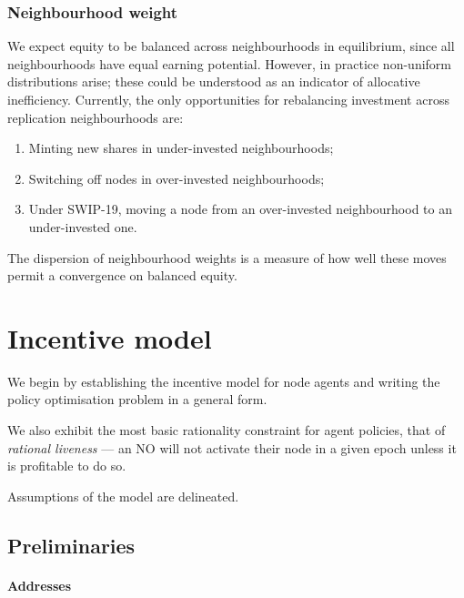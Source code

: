 \subsubsection{Neighbourhood weight}

We expect equity to be balanced across neighbourhoods in equilibrium, since all neighbourhoods have equal earning potential.
%
However, in practice non-uniform distributions arise; these could be understood as an indicator of allocative inefficiency.
%
Currently, the only opportunities for rebalancing investment across replication neighbourhoods are:
\begin{enumerate}
  \item Minting new shares in under-invested neighbourhoods;
  \item Switching off nodes in over-invested neighbourhoods;
  \item Under SWIP-19, moving a node from an over-invested neighbourhood to an under-invested one.
\end{enumerate}
%
The dispersion of neighbourhood weights is a measure of how well these moves permit a convergence on balanced equity.


\newpage

\section{Incentive model}
\label{section:model}

\begin{notes}
  
  \item We begin by establishing the incentive model for node agents and writing the policy optimisation problem in a general form.

  \item We also exhibit the most basic rationality constraint for agent policies, that of \emph{rational liveness} --- an NO will not activate their node in a given epoch unless it is profitable to do so.

  \item Assumptions of the model are delineated.

\end{notes}
\subsection{Preliminaries}

\paragraph{Addresses}


